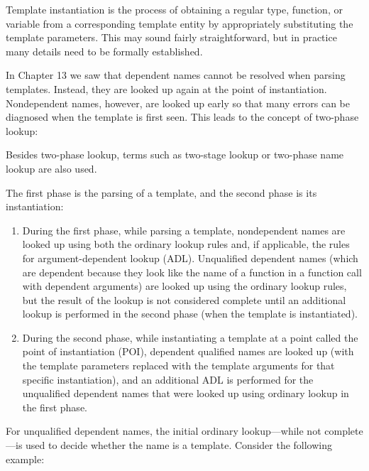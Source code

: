 
Template instantiation is the process of obtaining a regular type, function, or variable from a corresponding template entity by appropriately substituting the template parameters. This may sound fairly straightforward, but in practice many details need to be formally established.


In Chapter 13 we saw that dependent names cannot be resolved when parsing templates. Instead, they are looked up again at the point of instantiation. Nondependent names, however, are looked up early so that many errors can be diagnosed when the template is first seen. This leads to the concept of two-phase lookup:

\begin{tcolorbox}[colback=webgreen!5!white,colframe=webgreen!75!black]
\hspace*{0.75cm}Besides two-phase lookup, terms such as two-stage lookup or two-phase name lookup are also used.
\end{tcolorbox}

The first phase is the parsing of a template, and the second phase is its instantiation:

\begin{enumerate}
\item 
During the first phase, while parsing a template, nondependent names are looked up using both the ordinary lookup rules and, if applicable, the rules for argument-dependent lookup (ADL). Unqualified dependent names (which are dependent because they look like the name of a function in a function call with dependent arguments) are looked up using the ordinary lookup rules, but the result of the lookup is not considered complete until an additional lookup is performed in the second phase (when the template is instantiated).

\item 
During the second phase, while instantiating a template at a point called the point of instantiation (POI), dependent qualified names are looked up (with the template parameters replaced with the template arguments for that specific instantiation), and an additional ADL is performed for the unqualified dependent names that were looked up using ordinary lookup in the first phase.
\end{enumerate}

For unqualified dependent names, the initial ordinary lookup—while not complete—is used to decide whether the name is a template. Consider the following example:

